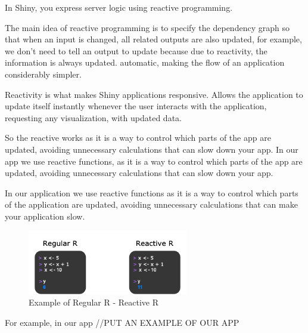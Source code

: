 In Shiny, you express server logic using reactive programming.

The main idea of ​​reactive programming is to specify the dependency graph so that when an input is changed, all related outputs are also updated, for example, we don't need to tell an output to update because due to reactivity, the information is always updated. automatic, making the flow of an application considerably simpler.
  
Reactivity is what makes Shiny applications responsive. Allows the application to update itself instantly whenever the user interacts with the application, requesting any visualization, with updated data.

So the reactive works as it is a way to control which parts of the app are updated, avoiding unnecessary calculations that can slow down your app.
In our app we use reactive functions, as it is a way to control which parts of the app are updated, avoiding unnecessary calculations that can slow down your app.

In our application we use reactive functions as it is a way to control which parts of the application are updated, avoiding unnecessary calculations that can make your application slow.



\begin{figure}[h]
\centering %
\includegraphics[width=7cm]{images/react.png} 

\caption{Example of Regular R - Reactive R}
\label{figura:qualquernome}
\end{figure}




For example, in our app //PUT AN EXAMPLE OF OUR APP
